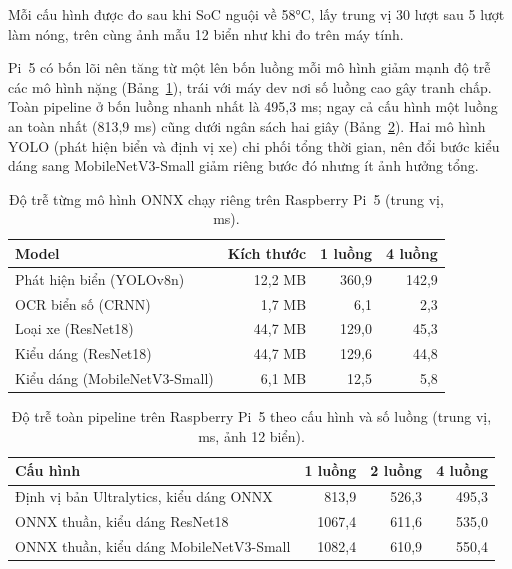 Mỗi cấu hình được đo sau khi SoC nguội về 58°C, lấy trung vị 30 lượt sau 5 lượt làm nóng,
trên cùng ảnh mẫu 12 biển như khi đo trên máy tính.

Pi~5 có bốn lõi nên tăng từ một lên bốn luồng mỗi mô hình giảm mạnh độ trễ các mô hình nặng
(Bảng~\ref{tab:pi-model}), trái với máy dev nơi số luồng cao gây tranh chấp. Toàn pipeline ở
bốn luồng nhanh nhất là 495,3 ms; ngay cả cấu hình một luồng an toàn nhất (813,9 ms) cũng
dưới ngân sách hai giây (Bảng~\ref{tab:pi-pipeline}). Hai mô hình YOLO (phát hiện biển và
định vị xe) chi phối tổng thời gian, nên đổi bước kiểu dáng sang MobileNetV3-Small giảm riêng
bước đó nhưng ít ảnh hưởng tổng.

\begin{table}[htbp]
\centering
\caption{Độ trễ từng mô hình ONNX chạy riêng trên Raspberry Pi~5 (trung vị, ms).}

\label{tab:pi-model}
\begin{tabular}{lrrr}
\toprule
\textbf{Model} & \textbf{Kích thước} & \textbf{1 luồng} & \textbf{4 luồng} \\
\midrule
Phát hiện biển (YOLOv8n)      & 12,2 MB & 360,9 & 142,9 \\
OCR biển số (CRNN)            &  1,7 MB &   6,1 &   2,3 \\
Loại xe (ResNet18)           & 44,7 MB & 129,0 &  45,3 \\
Kiểu dáng (ResNet18)         & 44,7 MB & 129,6 &  44,8 \\
Kiểu dáng (MobileNetV3-Small) &  6,1 MB &  12,5 &   5,8 \\
\bottomrule
\end{tabular}
\end{table}

\begin{table}[htbp]
\centering
\caption{Độ trễ toàn pipeline trên Raspberry Pi~5 theo cấu hình và số luồng (trung vị, ms, ảnh 12 biển).}

\label{tab:pi-pipeline}
\begin{tabular}{lrrr}
\toprule
\textbf{Cấu hình} & \textbf{1 luồng} & \textbf{2 luồng} & \textbf{4 luồng} \\
\midrule
Định vị bản Ultralytics, kiểu dáng ONNX   & 813,9 & 526,3 & 495,3 \\
ONNX thuần, kiểu dáng ResNet18            & 1067,4 & 611,6 & 535,0 \\
ONNX thuần, kiểu dáng MobileNetV3-Small   & 1082,4 & 610,9 & 550,4 \\
\bottomrule
\end{tabular}
\end{table}

